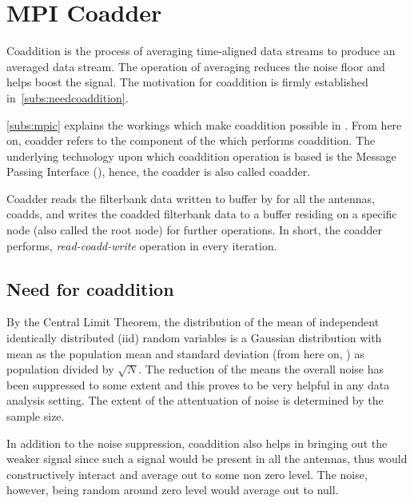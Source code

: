\section {MPI Coadder}

\par Coaddition is the process of averaging time-aligned data streams to produce an averaged data stream. The operation of averaging reduces the noise floor and helps boost the signal.
The motivation for coaddition is firmly established in~\autoref{subs:needcoaddition}. 

\par \autoref{subs:mpic} explains the workings which make coaddition possible in \vf. 
From here on, coadder refers to the component of the \vf which performs coaddition. The underlying technology upon which coaddition operation is based is the Message Passing Interface (\mpi), hence, the coadder is also called \mpi coadder.

\par Coadder reads the filterbank data written to \dada buffer by \pb for all the antennas, coadds, and writes the coadded filterbank data to a \dada buffer residing on a specific node (also called the root node) for further operations. 
In short, the coadder performs, \emph{read-coadd-write} operation in every iteration.

\subsection {Need for coaddition}
\label{subs:needcoaddition}
\par By the Central Limit Theorem, the distribution of the mean of independent identically distributed (iid) random variables is a Gaussian distribution with mean as the population mean and standard deviation (from here on, \sd) as population \sd divided by $\sqrt{N}$.
The reduction of the \sd means the overall noise has been suppressed to some extent and this proves to be very helpful in any data analysis setting. The extent of the attentuation of noise is determined by the sample size.

\par In addition to the noise suppression, coaddition also helps in bringing out the weaker signal since such a signal would be present in all the antennas, thus would constructively interact and average out to some non zero level. The noise, however, being random around zero level would average out to null.

